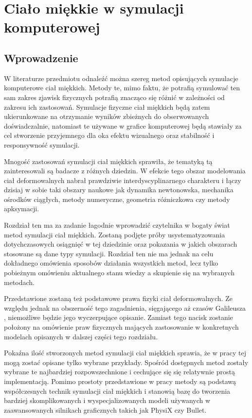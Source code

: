 \chapter{Ciało miękkie w symulacji komputerowej}

\section{Wprowadzenie}

W literaturze przedmiotu odnaleźć można szereg metod opisujących symulacje komputerowe ciał
miękkich. Metody te, mimo faktu, że potrafią symulować ten sam zakres zjawisk
fizycznych potrafią znacząco się różnić w zależności od zakresu ich zastosowań.
Symulacje fizyczne ciał miękkich będą zatem ukierunkowane na otrzymanie wyników
zbieżnych do obserwowanych doświadczalnie, natomiast te używane w grafice
komputerowej będą stawiały za cel stworzenie przyjemnego dla oka efektu
wizualnego oraz stabilność i responsywność symulacji.

Mnogość zastosowań symulacji ciał miękkich sprawiła, że tematyką tą
zainteresowali są badacze z różnych dziedzin. W efekcie tego obszar modelowania ciał
deformowalnych nabrał prawdziwie interdyscyplinarnego charakteru i łączy dzisiaj w sobie
taki obszary naukowe jak dynamika newtonowska, mechanika ośrodków ciągłych,
metody numeryczne, geometria różniczkowa czy metody apksymacji\cite{pbdo}.

Rozdział ten ma za zadanie łagodnie wprowadzić czytelnika w bogaty świat metod symulacji
ciał miękkich. Zostaną podjęte próby usystematyzowania dotychczasowych
osiągnięć w tej dziedzinie oraz pokazania w jakich obszarach stosowane są
dane typy symulacji. Rozdział ten nie ma jednak na celu dokładnego omówienia sposobów 
działania wszystkich metod, lecz tylko pobieżnym omówieniu aktualnego stanu
wiedzy a skupienie się na wybranych metodach.

Przedstawione zostaną też podstawowe prawa fizyki ciał deformowalnych. Ze
względu jednak na obszerność tego zagadnienia, sięgającego aż czasów Galileusza
\cite{elast}, niemożliwe będzie jego wyczerpujące opisanie. Zamiast tego nacisk
zostanie położony na omówienie praw fizycznych mających zastosowanie w
konkretnych modelach opisanych w dalszej części tego rozdziału.

Pokaźna ilość stworzonych metod symulacji ciał miękkich sprawia, że w pracy tej mogą zostać
opisane tylko wybrane przykłady. Spośród dostępnych metod zostały wybrane 
te najbardziej rozpowszechnione i cechujące się się
relatywnie prostą implementacją. Pomimo prostoty przedstawione w pracy
metody są podstawą współczesnych technik symulacji ciał
miękkich i stanowią bazę do tworzenia bardziej skomplikowanych i 
wyspecjalizowanych modeli używanych w zaawansowanych silnikach graficznych
takich jak PhysiX czy Bullet.

